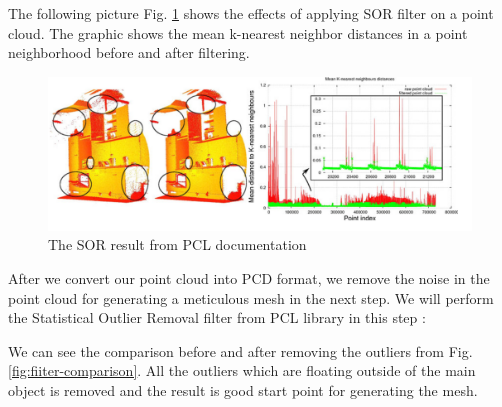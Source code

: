 \documentclass[runningheads,a4paper]{llncs}
\begin{document}
The following picture Fig. \ref{fig:SOR} shows the effects of applying SOR filter on a point cloud. The graphic shows the mean k-nearest neighbor distances in a point neighborhood before and after filtering\cite{12}.

\begin{figure}
\centering
\includegraphics[scale=.7]{SOR.PNG}
\caption{The SOR result from PCL documentation}
\label{fig:SOR}
\end{figure}

After we convert our point cloud into PCD format, we remove the noise in the point cloud for generating a meticulous mesh in the next step. We will perform the Statistical Outlier Removal filter from PCL library in this step \cite{13}:

We can see the comparison before and after removing the outliers from Fig.  \ref{fig:fiiter-comparison}. All the outliers which are floating outside of the main object is removed and the result is good start point for generating the mesh.
\end{document}

